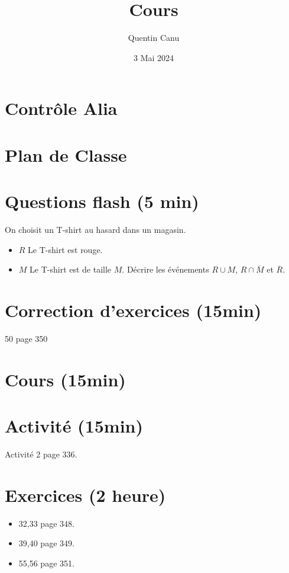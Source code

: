 \documentclass{article}
\title{Cours}
\date{3 Mai 2024}
\author{Quentin Canu}
\begin{document}
\maketitle
\section{Contrôle Alia}
\section{Plan de Classe}
\section{Questions flash (5 min)}
On choisit un T-shirt au hasard dans un magasin.
\begin{itemize}
\item $R$ \og Le T-shirt est rouge.\fg
\item $M$ \og Le T-shirt est de taille $M$.\fg
Décrire les événements $R \cup M$, $R \cap \overbar{M}$ et $\overbar{R}$.
\end{itemize}
\section{Correction d'exercices (15min)}
50 page 350
\section{Cours (15min)}
\section{Activité (15min)}
Activité 2 page 336.
\section{Exercices (2\ieme{} heure)}
\begin{itemize}
\item 32,33 page 348.
\item 39,40 page 349.
\item 55,56 page 351.
\end{itemize}
\end{document}
